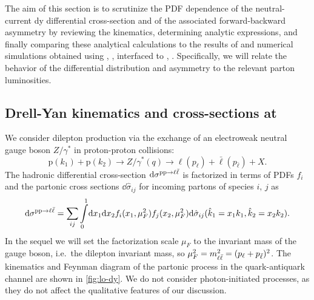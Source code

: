 
The aim of this  section is to scrutinize the PDF dependence of the
neutral-current \acrlong{dy} differential cross-section and of the associated
forward-backward asymmetry by reviewing the \lo kinematics, determining \lo
analytic expressions, and finally comparing these analytical calculations to
the results of \lo and \nlo  numerical simulations obtained using \mgamc,
\cite{Alwall:2014hca}, interfaced to \pineappl,
\cite{Carrazza:2020gss,christopher_schwan_2022_7023438}.
%
Specifically, we will relate the behavior of the differential distribution and
asymmetry to the relevant parton luminosities.

\subsection{Drell-Yan kinematics and cross-sections at \lo}
\label{sec:dylo}

We consider dilepton production via the exchange of an electroweak neutral
gauge boson $Z/\gamma^*$ in proton-proton collisions:
\begin{equation}
  \label{eq:DYprocess}
  \mathrm{p}(k_1) + \mathrm{p}(k_2) \to Z/\gamma^*(q) \to \ell(p_{\ell}) + \bar{\ell}(p_{\bar{\ell}}) + X \text{.}
\end{equation}
The hadronic differential cross-section $\dd\sigma^{\mathrm{p}\mathrm{p}\to\ell\bar{\ell}}$  is factorized in
terms of PDFs $f_i$ and the partonic cross sections
$\dd\hat\sigma_{ij}$ for incoming partons of species $i,\,j$ as
\begin{equation}
  \dd\sigma^{\mathrm{p}\mathrm{p}\to\ell\bar{\ell}} = \sum_{ij} \int\limits_0^1\!\dd x_1 \dd
  x_2 f_i(x_1,\mu_F^2) f_j(x_2,\mu_F^2) \dd\hat\sigma_{ij}(\hat k_1 = x_1
  k_1, \hat k_2 = x_2 k_2).
  \label{eq:factorization}
\end{equation}
In the sequel we will set the  factorization scale $\mu_F$ to the
invariant mass of the gauge boson, i.e.\ the dilepton
invariant mass, so $\mu^2_F = m_{\ell\bar{\ell}}^2=(p_\ell + p_{\bar{\ell}})^2$.
%
The kinematics and Feynman diagram of the \lo partonic process
in the quark-antiquark channel are shown in \cref{fig:lo-dy}.
We do not consider photon-initiated processes, as they do not affect
the qualitative features of our discussion.



